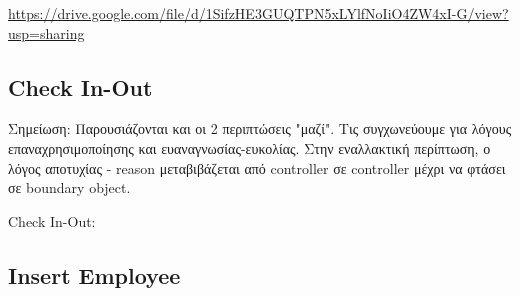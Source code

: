 \documentclass{article}
\begin{document}
\url{https://drive.google.com/file/d/1SifzHE3GUQTPN5xLYlfNoIiO4ZW4xI-G/view?usp=sharing}

\subsection{Check In-Out}

\noindent Σημείωση: Παρουσιάζονται και οι 2 περιπτώσεις "μαζί". Τις συγχωνεύουμε για λόγους επαναχρησιμοποίησης και ευαναγνωσίας-ευκολίας. Στην εναλλακτική περίπτωση, ο λόγος αποτυχίας - reason μεταβιβάζεται από controller σε controller μέχρι να φτάσει σε boundary object.

\noindent Check In-Out: \\
\noindent{}

\subsection{Insert Employee}
\noindent{}
\end{document}
